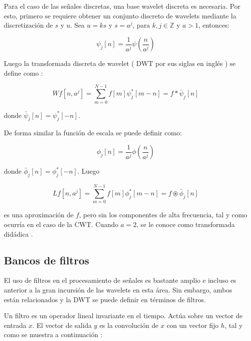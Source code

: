Para el caso de las señales discretas, una base wavelet discreta es necesaria. Por esto, primero se requiere
obtener un conjunto discreto de wavelets mediante la discretización de $s$ y $u$. Sea $u=ks$ y $s=a^j$, 
para $k,j \in \mathbb{Z}$ y $a>1$, entonces:

\begin{equation}
	\psi_j[n] = \frac{1}{a^j}\psi(\frac{n}{a^j})
\end{equation}

Luego la transformada discreta de wavelet ( DWT por sus siglas en inglés ) se define como \cite{Mallat2008}:

\begin{equation}\label{eq:Wf}
	Wf[n,a^j] = \sum_{m=0}^{N-1} f[m] \psi_{j}^*[m-n] = f * \bar \psi_j[n]
\end{equation}

\noindent donde $\bar \psi_j[n] = \psi_j^*[-n]$.

De forma similar la función de escala se puede definir como:

\begin{equation}
	\phi_j[n] = \frac{1}{a^j}\phi(\frac{n}{a^j})
\end{equation}

donde $\bar \phi_j[n] = \phi_j^*[-n]$. Luego 

\begin{equation}\label{eq:Lf}
	Lf[n,a^j] = \sum_{m=0}^{N-1} f[m] \phi_{j}^*[m-n] = f \circledast \bar \phi_j[n]
\end{equation}

\noindent es una aproximación de $f$, pero sin los componentes de alta frecuencia, tal y como ocurría en el caso
de la CWT. 
Cuando $a=2$, se le conoce como transformada didádica \cite{Mallat2008}.

\subsection{Bancos de filtros}\label{filter-banks}

El uso de filtros en el procesamiento de señales es bastante amplio e incluso es anterior a 
la gran incursión de las wavelets en esta área. 
Sin embargo, ambos están relacionados y la DWT se puede definir en términos de filtros.

Un filtro es un operador lineal invariante en el tiempo. Actúa sobre un vector de entrada $x$.
El vector de salida $y$  es la convolución de $x$ con un vector fijo $h$, tal y como se muestra
a continuación \cite{Gilbert95} :

